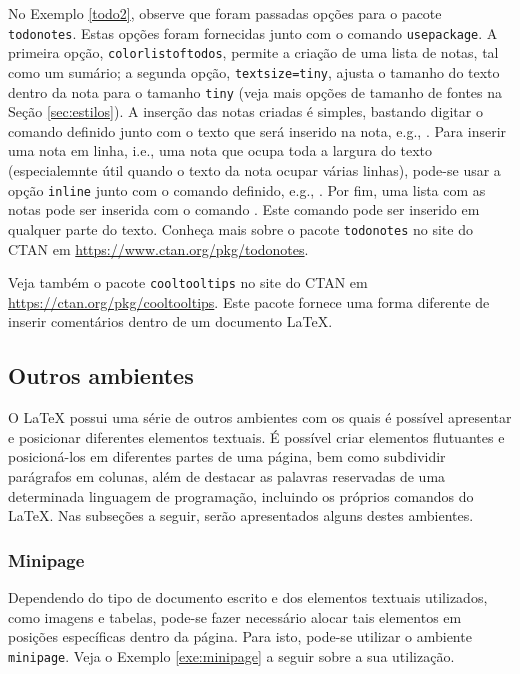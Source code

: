 No Exemplo \ref{todo2}, observe que foram passadas opções para o pacote {\tt todonotes}. Estas opções foram fornecidas junto com o comando {\tt usepackage}. A primeira opção, {\tt colorlistoftodos}, permite a criação de uma lista de notas, tal como um sumário; a segunda opção, {\tt textsize=tiny}, ajusta o tamanho do texto dentro da nota para o tamanho {\tt tiny} (veja mais opções de tamanho de fontes na Seção \ref{sec:estilos}). A inserção das notas criadas é simples, bastando digitar o comando definido junto com o texto que será inserido na nota, e.g., \texttt{}. Para inserir uma nota em linha, i.e., uma nota que ocupa toda a largura do texto (especialemnte útil quando o texto da nota ocupar várias linhas), pode-se usar a opção {\tt inline} junto com o comando definido, e.g., \texttt{}. Por fim, uma lista com as notas pode ser inserida com o comando \texttt{}. Este comando pode ser inserido em qualquer parte do texto. Conheça mais sobre o pacote {\tt todonotes} no site do CTAN em \url{https://www.ctan.org/pkg/todonotes}.

\begin{marker}
Veja também o pacote {\tt cooltooltips} no site do CTAN em \url{https://ctan.org/pkg/cooltooltips}. Este pacote fornece uma forma diferente de inserir comentários dentro de um documento \LaTeX{}.
\end{marker}

\subsection{Outros ambientes}
\label{sec:out_ambs}

O \LaTeX{} possui uma série de outros ambientes com os quais é possível apresentar e posicionar diferentes elementos textuais. É possível criar elementos flutuantes e posicioná-los em diferentes partes de uma página, bem como subdividir parágrafos em colunas, além de destacar as palavras reservadas de uma determinada linguagem de programação, incluindo os próprios comandos do \LaTeX{}. Nas subseções a seguir, serão apresentados alguns destes ambientes.

\subsubsection*{Minipage}
\label{sec:minipage}

Dependendo do tipo de documento escrito e dos elementos textuais utilizados, como imagens e tabelas, pode-se fazer necessário alocar tais elementos em posições específicas dentro da página. Para isto, pode-se utilizar o ambiente {\tt minipage}. Veja o Exemplo \ref{exe:minipage} a seguir sobre a sua utilização.

